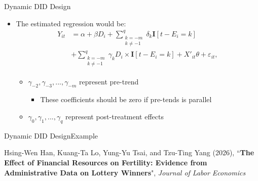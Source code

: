 \documentclass[dvipsnames,hyperref={pdfpagelabels=false}]{beamer}
\begin{document}
\begin{frame}{Dynamic DID Design}
	\begin{itemize}
		\item The estimated regression would be:
		\begin{align*}
				Y_{it}&=\alpha + \beta D_{i} + \sum^{q}_{\substack{k=-m\\k\neq-1}}\delta_{k} \mathbf{I}[t-E_{i}=k]  \\
				&+ \sum^{q}_{\substack{k=-m\\k\neq-1}}\gamma_{k} D_{i} \times \mathbf{I}[t-E_{i}=k]
				+X'_{it}\theta+\varepsilon_{it},
		\end{align*}
		\begin{itemize}
			\vspace{0.2cm}
			\item $\gamma_{-2}, \gamma_{-3},...,\gamma_{-m} $ represent pre-trend
			\vspace{0.2cm}
			\begin{itemize}			
				\item These coefficients should be zero if  pre-tends is parallel
				\vspace{0.2cm}
			\end{itemize}
			\item $\gamma_{0}, \gamma_{1},...,\gamma_{q} $ represent post-treatment effects
		\end{itemize}
	\end{itemize}
\end{frame}




\begin{frame}{Dynamic DID Design}{Example}
	
	
	Hsing-Wen Han, Kuang-Ta Lo, Yung-Yu Tsai, and Tzu-Ting Yang (2026), ``\textbf{The Effect of Financial Resources on Fertility: Evidence from Administrative Data on Lottery Winners}", \textit{Journal of Labor Economics}
	
	
	
\end{frame}
\end{document}
